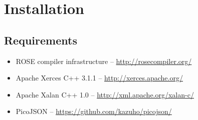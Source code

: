
\chapter{Installation}\label{chap:app}


\section{Requirements}

\begin{itemize}
 \item ROSE compiler infrastructure -- \url{http://rosecompiler.org/}
 \item Apache Xerces C++ 3.1.1 -- \url{http://xerces.apache.org/}
 \item Apache Xalan C++ 1.0 -- \url{http://xml.apache.org/xalan-c/}
 \item PicoJSON -- \url{https://github.com/kazuho/picojson/}
\end{itemize}




